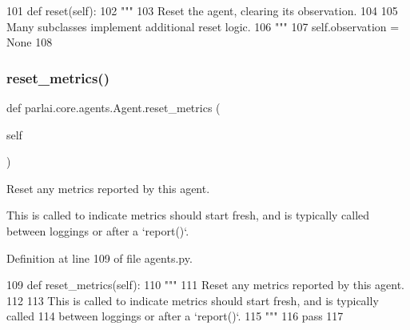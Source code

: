 \begin{DoxyCode}
101     \textcolor{keyword}{def }reset(self):
102         \textcolor{stringliteral}{"""}
103 \textcolor{stringliteral}{        Reset the agent, clearing its observation.}
104 \textcolor{stringliteral}{}
105 \textcolor{stringliteral}{        Many subclasses implement additional reset logic.}
106 \textcolor{stringliteral}{        """}
107         self.observation = \textcolor{keywordtype}{None}
108 
\end{DoxyCode}
\mbox{\label{classparlai_1_1core_1_1agents_1_1Agent_aaefcbd7c61d319b368b3ee13997c8c99}} 
\subsubsection{\texorpdfstring{reset\+\_\+metrics()}{reset\_metrics()}}
{\footnotesize\ttfamily def parlai.\+core.\+agents.\+Agent.\+reset\+\_\+metrics (\begin{DoxyParamCaption}\item[{}]{self }\end{DoxyParamCaption})}

\begin{DoxyVerb}Reset any metrics reported by this agent.

This is called to indicate metrics should start fresh, and is typically called
between loggings or after a `report()`.
\end{DoxyVerb}
 

Definition at line 109 of file agents.\+py.


\begin{DoxyCode}
109     \textcolor{keyword}{def }reset\_metrics(self):
110         \textcolor{stringliteral}{"""}
111 \textcolor{stringliteral}{        Reset any metrics reported by this agent.}
112 \textcolor{stringliteral}{}
113 \textcolor{stringliteral}{        This is called to indicate metrics should start fresh, and is typically called}
114 \textcolor{stringliteral}{        between loggings or after a `report()`.}
115 \textcolor{stringliteral}{        """}
116         \textcolor{keywordflow}{pass}
117 
\end{DoxyCode}
\mbox{\label{classparlai_1_1core_1_1agents_1_1Agent_a51e706e3e5389c9b48c7a1589d97ec99}} 
